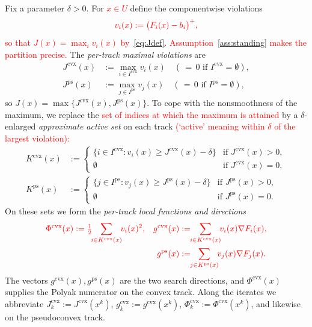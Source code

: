 \documentclass[]{interact}
\theoremstyle{plain}
\theoremstyle{definition}
\theoremstyle{remark}
\newcommand{\cvx}{\mathrm{cvx}}
\newcommand{\ps}{\mathrm{ps}}
\begin{document}
Fix a parameter $\delta>0$. For \leavevmode\textcolor{red}{$x\in U$} define the componentwise violations
\begin{equation}\label{eq:vi}\textcolor{red}{
v_i(x):=\bigl(F_i(x)-b_i\bigr)^+,
}\end{equation}
\leavevmode\textcolor{red}{so that $J(x)=\max_i v_i(x)$ by~\eqref{eq:Jdef}. Assumption~\ref{ass:standing} makes the
partition precise.} The \emph{per-track maximal violations} are
\begin{align}
J^{\cvx}(x)&:=\max_{i\in I^{\cvx}}v_i(x)\quad(\,{=}\,0\text{ if }I^{\cvx}=\emptyset),\label{eq:Jcvx}\\
J^{\ps}(x)&:=\max_{j\in I^{\ps}}v_j(x)\quad(\,{=}\,0\text{ if }I^{\ps}=\emptyset),\label{eq:Jps}
\end{align}
so $J(x)=\max\{J^{\cvx}(x),J^{\ps}(x)\}$. To cope with the nonsmoothness of the maximum,
we replace the \leavevmode\textcolor{red}{set of indices at which the maximum is attained} by a $\delta$-enlarged
\emph{approximate active set} on each track \leavevmode\textcolor{red}{(`active' meaning within $\delta$ of the largest
violation):}
\begin{align}
K^{\cvx}(x)&:=\begin{cases}\{i\in I^{\cvx}:v_i(x)\ge J^{\cvx}(x)-\delta\} & \text{if }J^{\cvx}(x)>0,\\ \emptyset & \text{if }J^{\cvx}(x)=0,\end{cases}\label{eq:Kcvx}\\[2pt]
K^{\ps}(x)&:=\begin{cases}\{j\in I^{\ps}:v_j(x)\ge J^{\ps}(x)-\delta\} & \text{if }J^{\ps}(x)>0,\\ \emptyset & \text{if }J^{\ps}(x)=0.\end{cases}\label{eq:Kps}
\end{align}
On these sets we form the \emph{per-track local functions and directions}
\begin{align}\color{red}
\Phi^{\cvx}(x)&\color{red}:=\tfrac12\!\!\sum_{i\in K^{\cvx}(x)}\!\! v_i(x)^2, &\color{red} g^{\cvx}(x)&\color{red}:=\!\!\sum_{i\in K^{\cvx}(x)}\!\! v_i(x)\nabla F_i(x),\label{eq:phi-g-cvx}\\\color{red}
&\color{red} &\color{red} g^{\ps}(x)&\color{red}:=\!\!\sum_{j\in K^{\ps}(x)}\!\! v_j(x)\nabla F_j(x).\label{eq:phi-g-ps}
\end{align}
The vectors $g^{\cvx}(x),g^{\ps}(x)$ are the two search directions, and $\Phi^{\cvx}(x)$
supplies the Polyak numerator on the convex track. Along the iterates we abbreviate
$J^{\cvx}_k:=J^{\cvx}(x^k)$, $g^{\cvx}_k:=g^{\cvx}(x^k)$, $\Phi^{\cvx}_k:=\Phi^{\cvx}(x^k)$,
and likewise on the pseudoconvex track.
\end{document}
